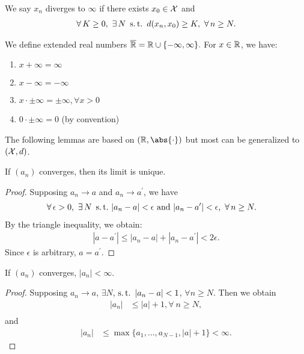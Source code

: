 \documentclass[12pt]{article}
\begin{document}
\begin{Definition}
We say $x_n$ diverges to $\infty$ if there exists $x_0\in\mathcal{X}$ and
\begin{align*}
\forall K\geq 0,\ \exists N\ \st d(x_n,x_0) \geq K,\ \forall n\geq N.
\end{align*}
\end{Definition}

We define extended real numbers $\overline{\mathbb{R}} = \mathbb{R} \cup \{-\infty, \infty\}.$ For $x \in \mathbb{R}$, we have:
\begin{enumerate}[1)]
\item $x + \infty = \infty$
\item $x - \infty = -\infty$
\item $x \cdot \pm\infty = \pm\infty, \forall x > 0$
\item $0 \cdot \pm\infty = 0$ (by convention)
\end{enumerate}

The following lemmas are based on $(\Real, \abs{\cdot})$ but most can be generalized to $(\mathcal{X},d)$. 

\begin{Lemma}\label{wk1:unique}
If $(a_n)$ converges, then its limit is unique.
\end{Lemma}

\begin{proof}
Supposing $a_n \to a$ and $a_n \to a^\prime$, we have
\begin{align*}
\forall \epsilon > 0,\ \exists N\ \st &|a_n - a| < \epsilon \text{ and } |a_n - a^\prime| < \epsilon,\ \forall n \geq N.
\end{align*}
By the triangle inequality, we obtain:
\begin{align*}
|a - a^\prime| \leq |a_n - a| + |a_n - a^\prime| < 2\epsilon.
\end{align*}
Since $\epsilon$ is arbitrary, $a = a^\prime$. 
\end{proof}

\begin{Lemma}\label{lem:conv_bdd}
If $(a_n)$ converges, $|a_n| < \infty$.
\end{Lemma}

\begin{proof}
Supposing $a_n \to a$, $\exists N$, $\st |a_n - a| < 1$, $\forall n \geq N$. Then we obtain
\begin{align*}
|a_n| &\leq |a| + 1, \forall\ n \geq N, \\
\end{align*}
and
\begin{align*}
|a_n| &\leq \max \{a_1, \ldots, a_{N-1}, |a|+1\} < \infty.
\end{align*} 
\end{proof}
\end{document}
